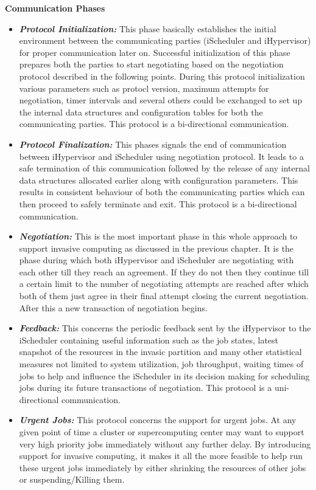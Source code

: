 \textbf{Communication Phases}
\begin{itemize}
\item \textbf{\textit{Protocol Initialization:}} This phase basically establishes the initial environment between the communicating parties (iScheduler and iHypervisor) for proper communication later on. Successful initialization of this phase prepares both the parties to start negotiating based on the negotiation protocol described in the following points. During this protocol initialization various parameters such as protocl version, maximum attempts for negotiation, timer intervals and several others could be exchanged to set up the internal data structures and configuration tables for both the communicating parties. This protocol is a bi-directional communication.
\item \textbf{\textit{Protocol Finalization:}} This phases signals the end of communication between iHypervisor and iScheduler using negotiation protocol. It leads to a safe termination of this communication followed by the release of any internal data structures allocated earlier along with configuration parameters. This results in consistent behaviour of both the communicating parties which can then proceed to safely terminate and exit. This protocol is a bi-directional communication.
\item \textbf{\textit{Negotiation:}} This is the most important phase in this whole approach to support invasive computing as discussed in the previous chapter. It is the phase during which both iHypervisor and iScheduler are negotiating with each other till they reach an agreement. If they do not then they continue till a certain limit to the number of negotiating attempts are reached after which both of them just agree in their final attempt closing the current negotiation. After this a new transaction of negotiation begins.
\item \textbf{\textit{Feedback:}} This concerns the periodic feedback sent by the iHypervisor to the iScheduler containing useful information such as the job states, latest snapshot of the resources in the invasic partition and many other statistical measures not limited to system utilization, job throughput, waiting times of jobs to help and influence the iScheduler in its decision making for scheduling jobs during its future transactions of negotiation. This protocol is a uni-directional communication.
\item \textbf{\textit{Urgent Jobs:}} This protocol concerns the support for urgent jobs. At any given point of time a cluster or supercomputing center may want to support very high priority jobs immediately without any further delay. By introducing support for invasive computing, it makes it all the more feasible to help run these urgent jobs immediately by either shrinking the resources of other jobs or suspending/Killing them.
\end{itemize}

